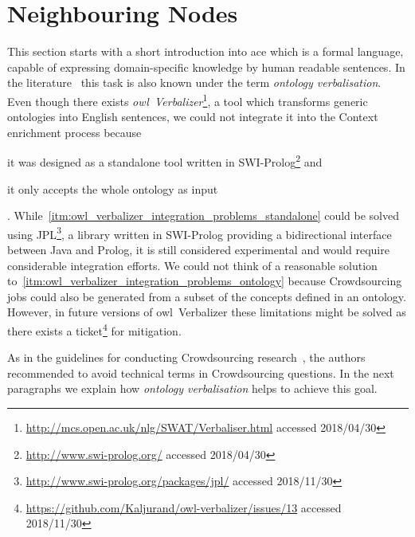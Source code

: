 
\section{Neighbouring Nodes}\label{sec:neighboring_nodes}
This section starts with a short introduction into \gls{ace} which is a formal language, capable of expressing domain-specific knowledge by human readable sentences. In the literature~\cite{soton265735} this task is also known under the term \textit{ontology verbalisation}. Even though there exists \textit{\gls{owl}~Verbalizer}\footnote{\url{http://mcs.open.ac.uk/nlg/SWAT/Verbaliser.html} accessed 2018/04/30}, a tool which transforms generic ontologies into English sentences, we could not integrate it into the Context enrichment process because 
\begin{inparaenum}[1)]
		\item \label{itm:owl_verbalizer_integration_problems_standalone} it was designed as a standalone tool written in SWI-Prolog\footnote{\url{http://www.swi-prolog.org/} accessed 2018/04/30} and
		\item \label{itm:owl_verbalizer_integration_problems_ontology} it only accepts the whole ontology as input
\end{inparaenum}. While~\ref{itm:owl_verbalizer_integration_problems_standalone} could be solved using JPL\footnote{\url{http://www.swi-prolog.org/packages/jpl/} accessed 2018/11/30}, a library written in SWI-Prolog providing a bidirectional interface between Java and Prolog, it is still considered experimental and would require considerable integration efforts. We could not think of a reasonable solution to~\ref{itm:owl_verbalizer_integration_problems_ontology} because Crowdsourcing jobs could also be generated from a subset of the concepts defined in an ontology. However, in future versions of \gls{owl}~Verbalizer these limitations might be solved as there exists a ticket\footnote{\url{https://github.com/Kaljurand/owl-verbalizer/issues/13} accessed 2018/11/30} for mitigation. 

As in the guidelines for conducting Crowdsourcing research~\cite{sarasua2015crowdsourcing}, the authors recommended to avoid technical terms in Crowdsourcing questions. In the next paragraphs we explain how \textit{ontology verbalisation} helps to achieve this goal. 

